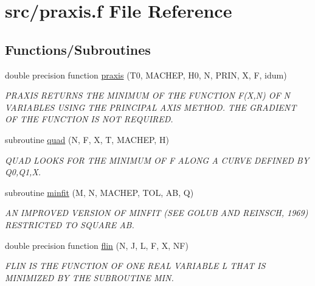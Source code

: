 \hypertarget{praxis_8f}{}\section{src/praxis.f File Reference}
\label{praxis_8f}
\subsection*{Functions/\+Subroutines}
\begin{DoxyCompactItemize}
\item 
double precision function \hyperlink{praxis_8f_ad363b84325df8361d0bce4a2456bef23}{praxis} (T0, M\+A\+C\+H\+EP, H0, N, P\+R\+IN, X, F, idum)
\begin{DoxyCompactList}\small\item\em P\+R\+A\+X\+IS R\+E\+T\+U\+R\+NS T\+HE M\+I\+N\+I\+M\+UM OF T\+HE F\+U\+N\+C\+T\+I\+ON F(\+X,\+N) OF N V\+A\+R\+I\+A\+B\+L\+ES U\+S\+I\+NG T\+HE P\+R\+I\+N\+C\+I\+P\+AL A\+X\+IS M\+E\+T\+H\+OD. T\+HE G\+R\+A\+D\+I\+E\+NT OF T\+HE F\+U\+N\+C\+T\+I\+ON IS N\+OT R\+E\+Q\+U\+I\+R\+ED. \end{DoxyCompactList}\item 
subroutine \hyperlink{praxis_8f_a0527d011f50eb026ac3ceea522e0ca5a}{quad} (N, F, X, T, M\+A\+C\+H\+EP, H)
\begin{DoxyCompactList}\small\item\em Q\+U\+AD L\+O\+O\+KS F\+OR T\+HE M\+I\+N\+I\+M\+UM OF F A\+L\+O\+NG A C\+U\+R\+VE D\+E\+F\+I\+N\+ED BY Q0,Q1,X. \end{DoxyCompactList}\item 
subroutine \hyperlink{praxis_8f_a4deca9e8eeda59dc7ea99e26c38d4a6d}{minfit} (M, N, M\+A\+C\+H\+EP, T\+OL, AB, Q)
\begin{DoxyCompactList}\small\item\em AN I\+M\+P\+R\+O\+V\+ED V\+E\+R\+S\+I\+ON OF M\+I\+N\+F\+IT (S\+EE G\+O\+L\+UB A\+ND R\+E\+I\+N\+S\+CH, 1969) R\+E\+S\+T\+R\+I\+C\+T\+ED TO S\+Q\+U\+A\+RE AB. \end{DoxyCompactList}\item 
double precision function \hyperlink{praxis_8f_a590128548b876bdd2e640b35ccee9515}{flin} (N, J, L, F, X, NF)
\begin{DoxyCompactList}\small\item\em F\+L\+IN IS T\+HE F\+U\+N\+C\+T\+I\+ON OF O\+NE R\+E\+AL V\+A\+R\+I\+A\+B\+LE L T\+H\+AT IS M\+I\+N\+I\+M\+I\+Z\+ED BY T\+HE S\+U\+B\+R\+O\+U\+T\+I\+NE M\+IN. \end{DoxyCompactList}\item 

\end{DoxyCompactItemize}
